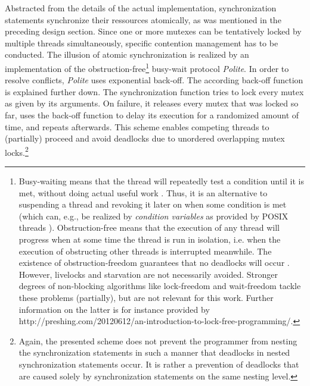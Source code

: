 Abstracted from the details of the actual implementation, synchronization statements synchronize their ressources atomically, as was mentioned in the preceding design section. Since one or more mutexes can be tentatively locked by multiple threads simultaneously, specific contention management has to be conducted. The illusion of atomic synchronization is realized by an implementation of the obstruction-free\footnote{Busy-waiting means that the thread will repeatedly test a condition until it is met, without doing actual useful work \cite[p.~166]{AnIntroductionToParallelProgramming}. Thus, it is an alternative to suspending a thread and revoking it later on when some condition is met (which can, e.g., be realized by \textit{condition variables} as provided by POSIX threads \cite[p.~77]{ProgrammingWithPOSIXThreads}). Obstruction-free means that the execution of any thread will progress when at some time the thread is run in isolation, i.e. when the execution of obstructing other threads is interrupted meanwhile. The existence of obstruction-freedom guarantees that no deadlocks will occur \cite{ObstructionFreeAuthorizationEnforcement}. However, livelocks and starvation are not necessarily avoided. Stronger degrees of non-blocking algorithms like lock-freedom and wait-freedom tackle these problems (partially), but are not relevant for this work. Further information on the latter is for instance provided by http://preshing.com/20120612/an-introduction-to-lock-free-programming/. %
} busy-wait protocol \textit{Polite}. In order to resolve conflicts, \textit{Polite} uses exponential back-off. The according back-off function is explained further down. The synchronization function tries to lock every mutex as given by its arguments. On failure, it releases every mutex that was locked so far, uses the back-off function to delay its execution for a randomized amount of time, and repeats afterwards. This scheme enables competing threads to (partially) proceed and avoid deadlocks due to unordered overlapping mutex locks.\footnote{Again, the presented scheme does not prevent the programmer from nesting the synchronization statements in such a manner that deadlocks in nested synchronization statements occur. It is rather a prevention of deadlocks that are caused solely by synchronization statements on the same nesting level.}
